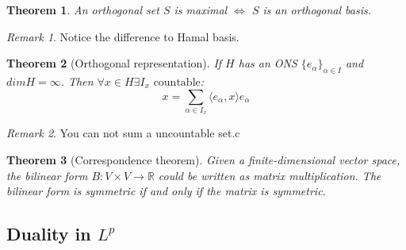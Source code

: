\documentclass[a4paper,11pt,fleqn]{book}
\newtheorem{theorem}{Theorem}[section]
\theoremstyle{definition}
\theoremstyle{remark}
\newtheorem*{remark}{Remark}
\begin{document}
\begin{theorem}
	An orthogonal set $S$ is maximal $\Leftrightarrow$ $S$ is an orthogonal basis.
\end{theorem}
\begin{remark}
Notice the difference to Hamal basis.	
\end{remark}

\begin{theorem}[Orthogonal representation]
	If $H$ has an ONS $\{e_\alpha\}_{\alpha \in I}$ and $dimH = \infty$. Then $\forall x \in H \exists I_x  \text{ countable}$:
	\begin{equation*}
		x = \sum_{\alpha \in I_x}\langle e_\alpha, x \rangle e_\alpha
	\end{equation*}
\end{theorem}
\begin{remark}
You can not sum a uncountable set.c	
\end{remark}

\begin{theorem}[Correspondence theorem]
Given a finite-dimensional vector space, the bilinear form $B: V \times V \rightarrow \mathbb{R}$ could be written as matrix multiplication. The bilinear form is symmetric if and only if the matrix is symmetric. 
\end{theorem}



\subsection*{Duality in $L^p$}
\end{document}
